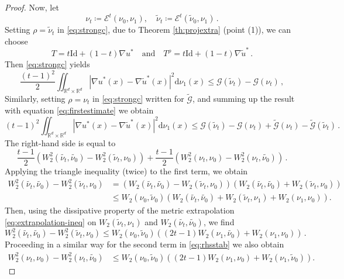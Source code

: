 \documentclass[12pt]{amsart}
\def\ed{\mathrm{d}}
\def\mc#1{\mathcal{#1}}
\begin{document}
\begin{proof}
Now, let
\[
    \nu_t \coloneqq \mathscr{E}^t(\nu_0,\nu_1), \quad \tilde{\nu}_t \coloneqq \mathscr{E}^t(\tilde{\nu}_0,\nu_1)\,.
\]
Setting $\rho = \tilde{\nu}_t$ 
 in \eqref{eq:strongc}, due to Theorem \ref{th:projextra} (point (1)),   we can choose 
\[T = t\mathrm{Id} +(1-t) \nabla u^*\quad \text{and} \quad T^\rho = t \mathrm{Id} +(1-t)\nabla\tilde{u}^*\,. \] 
Then \eqref{eq:strongc}   yields
\begin{equation}\label{eq:firstestimate}
\frac{(t-1)^2}{2} \iint_{\mathbb{R}^d\times \mathbb{R}^d} |\nabla u^*(x)-\nabla \tilde{u}^*(x)|^2\ed \nu_1(x) \leq \mc{G}(\tilde{\nu}_t) - \mc{G}(\nu_t)\,,
\end{equation}
Similarly, setting $\rho=\nu_t$ in \eqref{eq:strongc} written for $\tilde{\mc{G}}$, and summing up the result with equation \eqref{eq:firstestimate} we obtain
\begin{equation}\label{eq:secondestimate}
    (t-1)^2 \iint_{\mathbb{R}^d\times \mathbb{R}^d} |\nabla u^*(x)-\nabla \tilde{u}^*(x)|^2\ed \nu_1(x) \leq \mc{G}(\tilde{\nu}_t) - \mc{G}(\nu_t) +\tilde{\mc{G}}(\nu_t) - \tilde{\mc{G}}(\tilde{\nu}_t)\,.
\end{equation}
The right-hand side is equal to
\begin{equation}\label{eq:rhsstab}
    \frac{t-1}{2}(W^2_2(\tilde{\nu_t},\tilde{\nu_0})-W_2^2(\tilde{\nu}_t,\nu_0) )  +\frac{t-1}{2}(W^2_2(\nu_t,\nu_0)-W^2_2(\nu_t,\tilde{\nu_0}))\,.
\end{equation}
 Applying the triangle inequality (twice) to the first term, we obtain
\[
\begin{aligned}
    W^2_2(\tilde{\nu_t},\tilde{\nu_0})-W_2^2(\tilde{\nu}_t,\nu_0) & = (W_2(\tilde{\nu_t},\tilde{\nu_0})-W_2(\tilde{\nu}_t,\nu_0))(W_2(\tilde{\nu_t},\tilde{\nu_0})+W_2(\tilde{\nu}_t,\nu_0))\\&\leq W_2(\nu_0,\tilde{\nu}_0) (W_2(\tilde{\nu_t},\tilde{\nu_0})+W_2(\tilde{\nu}_t, \nu_1) + W_2(\nu_1, \nu_0)).
\end{aligned}
\]
Then, using the dissipative property of the metric extrapolation \eqref{eq:extrapolation-ineq} on $W_2(\tilde{\nu}_t, \nu_1)$ and $W_2(\tilde{\nu_t},\tilde{\nu_0})$, we find 
\[
    W^2_2(\tilde{\nu_t},\tilde{\nu_0})-W_2^2(\tilde{\nu}_t,\nu_0) \leq W_2(\nu_0,\tilde{\nu}_0) ((2t-1) W_2(\nu_1,\tilde{\nu_0})+W_2({\nu}_1, \nu_0))\,.
\]
Proceeding in a similar way for the second term in \eqref{eq:rhsstab} we also obtain
\[
\begin{aligned}
   W^2_2(\nu_t,\nu_0)-W_2^2(\nu_t,\tilde{\nu_0})
    &\leq W_2(\nu_0,\tilde{\nu}_0) ((2t-1) W_2(\nu_1,\nu_0)+W_2({\nu}_1, \tilde{\nu}_0)).
\end{aligned}
\]


\end{proof}
\end{document}
